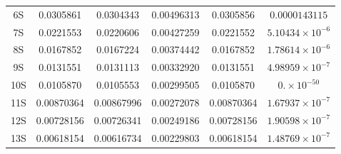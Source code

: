 \documentclass[cs4size,titlepage,twoside]{ctexart}
\begin{document}
\begin{table}[!hbp]
\begin{tabular}{|cccccc|}
		6S                    & 0.0305861                                  & 0.0304343                                        & 0.00496313                                       & 0.0305856                                                                           & $0.0000143115$           \\
		7S                    & 0.0221553                                  & 0.0220606                                        & 0.00427259                                       & 0.0221552                                                                           & $5.10434\times10^{-6}$   \\
		8S                    & 0.0167852                                  & 0.0167224                                        & 0.00374442                                       & 0.0167852                                                                           & $1.78614\times10^{-6}$   \\
		9S                    & 0.0131551                                  & 0.0131113                                        & 0.00332920                                       & 0.0131551                                                                           & $4.98959\times10^{-7}$   \\
		10S                   & 0.0105870                                  & 0.0105553                                        & 0.00299505                                       & 0.0105870                                                                           & $0.\times10^{-50}$       \\
		11S                   & 0.00870364                                 & 0.00867996                                       & 0.00272078                                       & 0.00870364                                                                          & $1.67937\times10^{-7}$   \\
		12S                   & 0.00728156                                 & 0.00726341                                       & 0.00249186                                       & 0.00728156                                                                          & $1.90598\times10^{-7}$   \\
		13S                   & 0.00618154                                 & 0.00616734                                       & 0.00229803                                       & 0.00618154                                                                          & $1.48769\times10^{-7}$   \\

\end{tabular}
\end{table}
\end{document}
